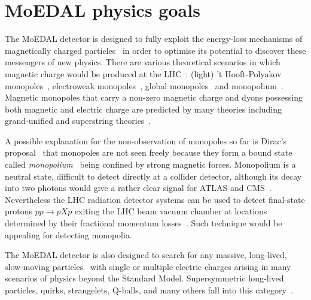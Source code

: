 \section{MoEDAL physics goals}\label{sc:mm}

The MoEDAL detector is designed to fully exploit the energy-loss mechanisms of magnetically charged particles~\cite{Dirac:1931kp,Dirac:1948um,tHooft:1974kcl,Polyakov:1974ek}  in order to optimise its potential to discover these messengers of new physics. There are various theoretical scenarios in which magnetic charge would be produced  at the LHC~\cite{Acharya:2014nyr}: (light) 't Hooft-Polyakov monopoles~\cite{tHooft:1974kcl,Polyakov:1974ek,Vento:2013jua}, electroweak monopoles~\cite{Cho:1996qd,Bae:2002bm,Cho:2012bq,Cho:2016npz,Ellis:2016glu}, global monopoles~\cite{Barriola:1989hx,Drukier:1981fq,Mazur:1990ak,Mavromatos:2016mnj} and monopolium~\cite{Dirac:1948um,Zeldovich:1978wj,Hill:1982iq,Dubrovich:2002gp}. Magnetic monopoles that carry a non-zero magnetic charge and dyons possessing both magnetic and electric charge are predicted by many theories including grand-unified and superstring theories~\cite{Rajantie:2012xh,Rajantie:2016paj,Kephart:2017esj}. 
 
A possible explanation for the non-observation of monopoles so far is Dirac's proposal~\cite{Dirac:1931kp,Dirac:1948um,Zeldovich:1978wj} that monopoles are not seen freely because they form a bound state called \emph{monopolium}~\cite{Hill:1982iq,Dubrovich:2002gp,Epele:2007ic,Epele:2008un} being confined by strong magnetic forces. Monopolium is a neutral state, difficult to detect directly at a collider detector, although its decay into two photons would give a rather clear signal for ATLAS and CMS~\cite{Epele:2016wps}. Nevertheless the LHC radiation detector systems can be used to detect final-state protons $pp\to pXp$ exiting the LHC beam vacuum chamber at locations determined by their fractional momentum losses~\cite{Kalliokoski:2016fjr}. Such technique would be appealing for detecting monopolia. 

The MoEDAL detector is also designed to search for any massive, long-lived, slow-moving particles~\cite{Fairbairn:2006gg,Burdin:2014xma} with single or multiple electric charges  arising in many scenarios of physics beyond the Standard Model. Supersymmetric long-lived particles, quirks, strangelets, Q-balls, and many others fall into this category~\cite{Acharya:2014nyr}.

